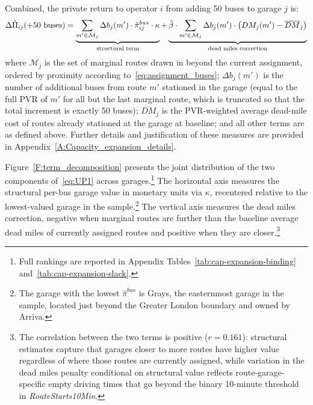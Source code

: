 \documentclass[12pt]{article}
\begin{document}
Combined, the private return to operator $i$ from adding
50 buses to garage $j$ is:
%
\begin{equation}\label{eq:UP1}
  \Delta\hat{\Pi}_{ij}(+50\text{ buses}) =
  \underbrace{%
    \sum_{m' \in \mathcal{M}_j}
    \Delta b_j(m') \cdot \hat{\pi}_{ij}^{bus} \cdot \kappa
  }_{\text{structural term}}
  +
  \underbrace{%
    \hat{\beta} \cdot \sum_{m' \in \mathcal{M}_j} \Delta b_j(m')
    \cdot \bigl(DM_j(m') - \overline{DM}_j\bigr)
  }_{\text{dead miles correction}}
\end{equation}
%
where $\mathcal{M}_j$ is the set of marginal routes drawn in beyond the
current assignment, ordered by proximity according
to~\eqref{eq:assignment_buses}; $\Delta b_j(m')$ is the number of additional
buses from route $m'$ stationed in the garage (equal to the full PVR of $m'$
for all but the last marginal route, which is truncated so that the total
increment is exactly 50 buses); $\overline{DM}_j$ is the PVR-weighted average
dead-mile cost of routes already stationed at the garage at baseline; and all
other terms are as defined above. Further details and justification of these
measures are provided in Appendix~\ref{A:Capacity_expansion_details}.



 
Figure~\ref{F:term_decomposition} presents the joint distribution of the two
components of~\eqref{eq:UP1} across garages.\footnote{Full rankings are
reported in Appendix Tables~\ref{tab:cap-expansion-binding}
and~\ref{tab:cap-expansion-slack}.} The horizontal axis measures the
structural per-bus garage value in monetary units via $\kappa$, recentered
relative to the lowest-valued garage in the sample.\footnote{The garage with
the lowest $\hat{\pi}^{bus}$ is Grays, the easternmost garage in the sample,
located just beyond the Greater London boundary and owned by Arriva.} The
vertical axis measures the dead miles correction, negative when marginal
routes are further than the baseline average dead miles of currently assigned
routes and positive when they are closer.\footnote{The correlation between
the two terms is positive ($r = 0.161$): structural estimates capture that
garages closer to more routes have higher value regardless of where those
routes are currently assigned, while variation in the dead miles penalty
conditional on structural value reflects route-garage-specific empty driving
times that go beyond the binary 10-minute threshold in
\textit{RouteStarts10Min}.}
 
\end{document}
